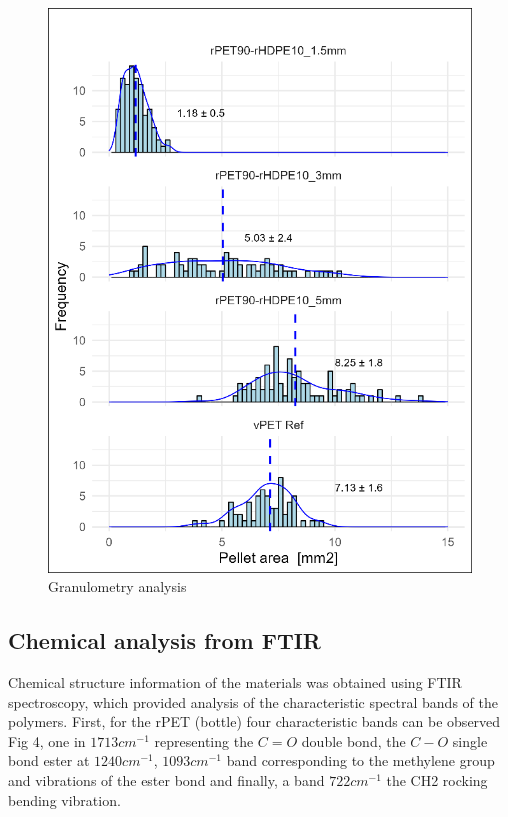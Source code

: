 \documentclass[
  12pt,
  number,
  review]{elsarticle}
\begin{document}
\begin{figure}

{\centering \includegraphics{figures/Figure-3.png}

}

\caption{\label{fig-granulometry}Granulometry analysis}

\end{figure}

\hypertarget{chemical-analysis-from-ftir}{%
\subsection{Chemical analysis from
FTIR}\label{chemical-analysis-from-ftir}}

Chemical structure information of the materials was obtained using FTIR
spectroscopy, which provided analysis of the characteristic spectral
bands of the polymers. First, for the rPET (bottle) four characteristic
bands can be observed Fig 4, one in \(1713 cm^{-1}\) representing the
\(C=O\) double bond, the \(C-O\) single bond ester at \(1240 cm^{-1}\),
\(1093 cm^{-1}\) band corresponding to the methylene group and
vibrations of the ester bond and finally, a band \(722 cm^{-1}\) the CH2
rocking bending vibration.
\end{document}
